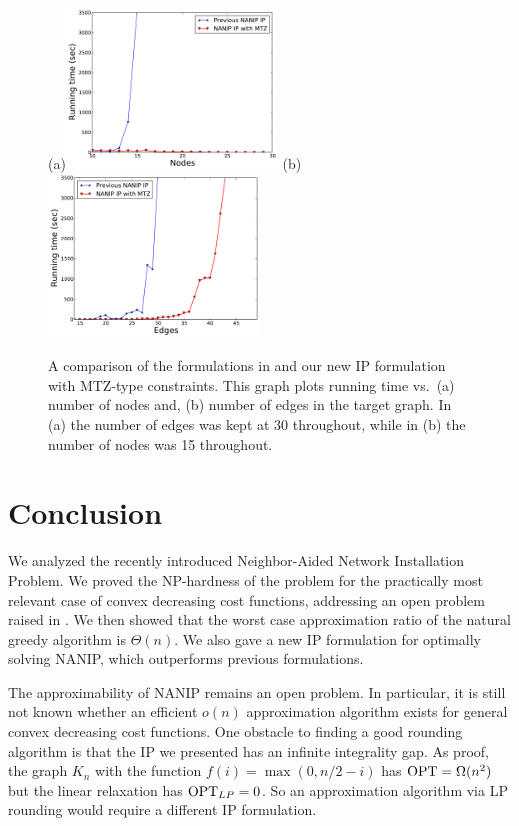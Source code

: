 \begin{figure}[th]
\begin{centering}
(a)\includegraphics[width=0.5\textwidth]{figures/perf_ip_nodes} 
(b)\includegraphics[width=0.5\textwidth]{figures/perf_ip_edges} 
\par
\end{centering}
\caption{A comparison of the formulations in
\cite{Gutfraind14} and our new IP formulation with MTZ-type
constraints.  This graph plots running time vs.\ (a) number of nodes and, (b)
number of edges in the target graph.
In (a) the number of edges was kept at 30 throughout, while in (b) the number
of nodes was 15 throughout.\label{fig:iptime}} 
\end{figure}


\section{Conclusion} \label{sec:concl}
We analyzed the recently introduced Neighbor-Aided Network Installation
Problem.  We proved the NP-hardness of the problem for the practically most
relevant case of convex decreasing cost functions, addressing an open problem
raised in \cite{Gutfraind14}.  We then showed that the worst case approximation
ratio of the natural greedy algorithm is $\Theta(n)$.  We also gave a new IP
formulation for optimally solving NANIP, which outperforms previous
formulations.

The approximability of NANIP remains an open problem. In particular, it is
still not known whether an efficient $o(n)$ approximation algorithm exists for
general convex decreasing cost functions. One obstacle to finding a good
rounding algorithm is that the IP we presented has an infinite integrality gap.
As proof, the graph $K_n$ with the function $f(i) = \max(0, n/2 - i)$ has
$\textup{OPT} = \Omega(n^2)$ but the linear relaxation has $\textup{OPT}_{LP} =
0$. So an approximation algorithm via LP rounding would require a different IP
formulation.

